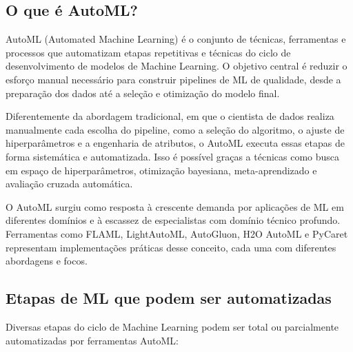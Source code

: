 \documentclass[11pt, a4paper, oneside]{article}
\begin{document}
\subsection{O que é AutoML?}
\label{sec:o-que-e-automl}

AutoML (Automated Machine Learning) é o conjunto de técnicas, ferramentas e processos
que automatizam etapas repetitivas e técnicas do ciclo de desenvolvimento de modelos
de Machine Learning. O objetivo central é reduzir o esforço manual necessário para
construir pipelines de ML de qualidade, desde a preparação dos dados até a seleção e
otimização do modelo final.

Diferentemente da abordagem tradicional, em que o cientista de dados realiza
manualmente cada escolha do pipeline, como a seleção do algoritmo, o ajuste de
hiperparâmetros e a engenharia de atributos, o AutoML executa essas etapas de forma
sistemática e automatizada. Isso é possível graças a técnicas como busca em espaço de
hiperparâmetros, otimização bayesiana, meta-aprendizado e avaliação cruzada automática.

O AutoML surgiu como resposta à crescente demanda por aplicações de ML em diferentes
domínios e à escassez de especialistas com domínio técnico profundo. Ferramentas como
FLAML, LightAutoML, AutoGluon, H2O AutoML e PyCaret representam implementações
práticas desse conceito, cada uma com diferentes abordagens e focos.

\subsection{Etapas de ML que podem ser automatizadas}
\label{sec:etapas-automatizadas}

Diversas etapas do ciclo de Machine Learning podem ser total ou parcialmente
automatizadas por ferramentas AutoML:
\end{document}
